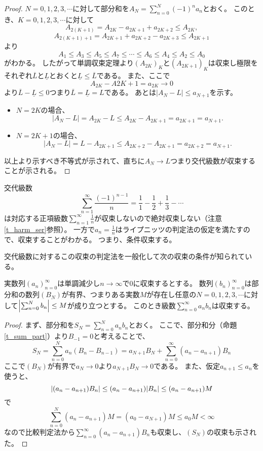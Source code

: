 \begin{proof}
$N = 0, 1, 2, 3, \cdots$に対して部分和を$A_N = \sum_{n = 0}^N (-1)^n a_n$とおく。
このとき、$K = 0, 1, 2, 3, \cdots$に対して
$$
A_{2(K+1)} = A_{2 K}-a_{2 K+1}+a_{2 K+2} \le A_{2 K},
$$
$$
A_{2(K+1)+1} = A_{2 K+1}+a_{2 K+2}-a_{2 K+3} \le A_{2 K+1}
$$
より
$$
A_1 \le A_3 \le A_5 \le A_7 \le \cdots \le A_6 \le A_4 \le A_2 \le A_0
$$
がわかる。
したがって単調収束定理より$(A_{2 K})_K$と$(A_{2 K+1})_K$は収束し極限をそれぞれ$\overline{L}$と$\underline{L}$とおくと$\underline{L} \le \overline{L}$である。
また、ここで
$$
A_{2 K}-A{2 K+1} = a_{2 K} \to 0
$$
より$\overline{L}-\underline{L} \le 0$つまり$\overline{L} = \underline{L} = L$である。
あとは$|A_N-L| \le a_{N+1}$を示す。
\begin{itemize}
\item
$N = 2 K$の場合、
$$
|A_N-L| = A_{2 K}-L \le A_{2 K}-A_{2 K+1} = a_{2 K+1} = a_{N+1}.
$$
\item
$N = 2 K+1$の場合、
$$
|A_N-L| = L-A_{2 K+1} \le A_{2 K+2}-A_{2 K+1} = a_{2 K+2} = a_{N+1}.
$$
\end{itemize}
以上より示すべき不等式が示されて、直ちに$A_N \to L$つまり交代級数が収束することが示される。
\end{proof}

\begin{example}
\label{t_alt_harm_ser}
交代級数
$$
\sum_{n = 1}^\infty \frac{(-1)^{n-1}}{n} = \frac{1}{1}-\frac{1}{2}+\frac{1}{3}-\cdots
$$
は対応する正項級数$\sum_{n = 1}^\infty \frac{1}{n}$が収束しないので絶対収束しない（注意\ref{t_harm_ser}参照）。
一方で$a_n = \frac{1}{n}$はライプニッツの判定法の仮定を満たすので、収束することがわかる。
つまり、条件収束する。
\end{example}

交代級数に対するこの収束の判定法を一般化して次の収束の条件が知られている。

\begin{theorem}[ディリクレの判定法]
実数列$(a_n)_{n = 0}^\infty$は単調減少し$n \to \infty$で$0$に収束するとする。
数列$(b_n)_{n = 0}^\infty$は部分和の数列$(B_N)$が有界、つまりある実数$M$が存在し任意の$N = 0, 1, 2, 3, \cdots$に対して$\abs{\sum_{n = 0}^N b_n} \le M$が成り立つとする。
このとき級数$\sum_{n = 0}^\infty a_n b_n$は収束する。
\end{theorem}

\begin{proof}
まず、部分和を$S_N = \sum_{n = 0}^N a_n b_n$とおく。
ここで、部分和分（命題\ref{t_sum_part}）より$B_{-1} = 0$と考えることで、
$$
S_N = \sum_{n = 0}^N a_n(B_n-B_{n-1}) = a_{N+1}B_N+\sum_{n = 0}^\infty (a_n-a_{n+1})B_n
$$
ここで$(B_N)$が有界で$a_N \to 0$より$a_{N+1}B_N \to 0$である。
また、仮定$a_{n+1} \le a_n$を使うと、
$$
\abs{(a_n-a_{n+1})B_n} \le (a_n-a_{n+1})\abs{B_n} \le (a_n-a_{n+1})M
$$
で
$$
\sum_{n = 0}^N (a_n-a_{n+1})M = (a_0-a_{N+1})M \le a_0 M < \infty
$$
なので比較判定法から$\sum_{n = 0}^\infty (a_n-a_{n+1})B_n$も収束し、$(S_N)$の収束も示された。
\end{proof}

